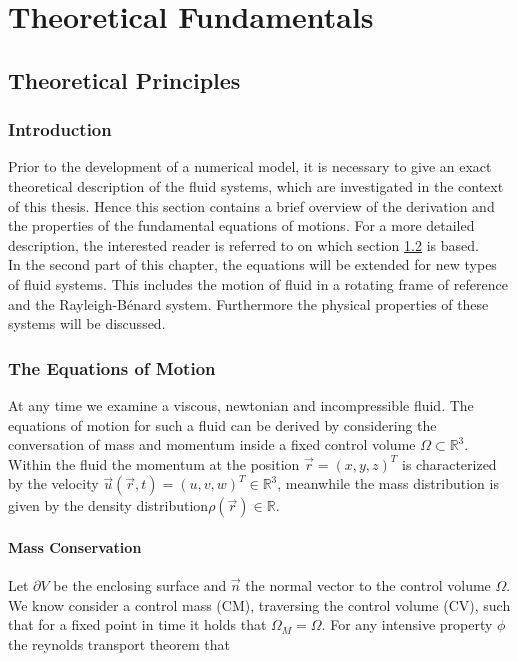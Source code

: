 \part{Theoretical Fundamentals}
\chapter{Theoretical Principles}

\section{Introduction}

Prior to the development of a numerical model, it is necessary to give an exact theoretical description of the
fluid systems, which are investigated in the context of this thesis.
Hence this section contains a brief overview of the derivation and the properties of the fundamental equations of motions.
For a more detailed description, the interested reader is referred to \citep{ferziger99} on which section \ref{theorie:eqm1} is based.\\
In the second part of this chapter, the equations will be extended for new types of fluid systems.
This includes the motion of fluid in a rotating frame of reference and the Rayleigh-B\'{e}nard system.
Furthermore the physical properties of these systems will be discussed.

\section{The Equations of Motion}\label{theorie:eqm1}

At any time we examine a viscous, newtonian and incompressible fluid. The equations of motion for such a fluid can be derived by considering the conversation of
mass and momentum inside a fixed control volume $\Omega \subset \mathbb{R}^3$.
Within the fluid the momentum at the position $\vec{r} = (x, y, z)^T$  is  characterized by the velocity $\vec{u}(\vec{r}, t) = (u, v, w)^T \in \mathbb{R}^3$,
meanwhile the mass distribution is given by the density distribution$\rho(\vec{r}) \in \mathbb{R}$.

\subsection{Mass Conservation}

Let $\partial V$ be the enclosing surface and $\vec{n}$ the normal vector to the control volume $\Omega$.
We know consider a control mass (CM), traversing the control volume (CV), such that for a fixed point in time it holds that $\Omega_M = \Omega$.
For any intensive property $\phi$ the reynolds transport theorem that


